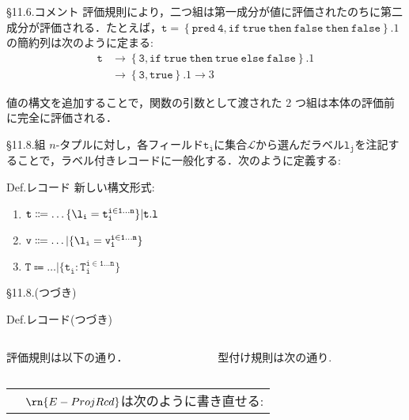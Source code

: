 \documentclass[9pt]{beamer}
\makeatletter
\newcommand{\dnote}[1]{%
    \noindent %
    \begin{tabular}{@{}m{0.13\textwidth}@{}m{0.87\textwidth}@{}}%
        \huge\textdbend &#1%
    \end{tabular}%
    \par %
}
\makeatother
\begin{document}
\begin{frame}{\S11.6.コメント}
評価規則により，二つ組は第一成分が値に評価されたのちに第二成分が評価される．たとえば，$\mathtt{t = \left\{pred\ 4,if\ true\ then\ false\ then\ false\right\}.1}$の簡約列は次のように定まる:
\begin{align*}
\mathtt{t}&\longrightarrow \mathtt{\left\{3, if\ true\ then\ true\ else\ false\right\}}.1\\
  &\longrightarrow \mathtt{\left\{3, true\right\}.1}\longrightarrow 3
\end{align*}

値の構文を追加することで，関数の引数として渡された 2 つ組は本体の評価前に完全に評価される．
\end{frame}
\begin{frame}{\S11.8.組}
$n$-タプルに対し，各フィールド$\mathtt{t_{i}}$に集合$\mathscr{L}$から選んだラベル$\mathtt{l_{j}}$を注記することで，ラベル付きレコードに一般化する．次のように定義する:
\begin{alertblock}{Def.レコード}
新しい構文形式:\begin{enumerate}
\item $\mathtt{t\Coloneq\ldots\{\l_{i}=t_{i}^{i\in1\ldots n}\}|t.l}$
\item $\mathtt{v\Coloneq\ldots|\{\l_{i}=v_{i}^{i\in1\ldots n}\}}$
\item $\mathtt{T\Coloneq\ldots|\{t_{i}:T_{i}^{i\in1\ldots n}\}}$
\end{enumerate}
\end{alertblock}
\end{frame}
\begin{frame}{\S11.8.(つづき)}
\begin{alertblock}{Def.レコード(つづき)}
\begin{columns}
\begin{column}{0.5\columnwidth}
評価規則は以下の通り．

\end{column}
\begin{column}{0.5\columnwidth}
型付け規則は次の通り.
\end{column}
\end{columns}
\end{alertblock}
\dnote{$\rn{E-ProjRcd}$は次のように書き直せる:\infrule[E-ProjRcd]{1\leq j \leq n \andalso \mathtt{l_{j}}\in\mathscr{L}}{\{\mathtt{l_{i}= v_{i}^{i\in1\ldots n}\}.l_{j}\longrightarrow v_{j}}}}
\end{frame}
\end{document}
